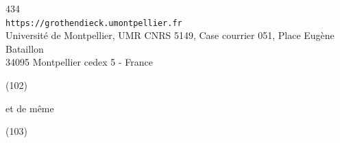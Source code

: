 \begin{center}
{\small
434\\
\texttt{https://grothendieck.umontpellier.fr}\\
Université de Montpellier, UMR CNRS 5149, Case courrier 051, Place Eugène Bataillon\\
34095 Montpellier cedex 5 - France
}
\end{center}


\begin{samepage}
\noindent(102)
\end{samepage}

et de même

\begin{samepage}
\noindent(103)
\end{samepage}


